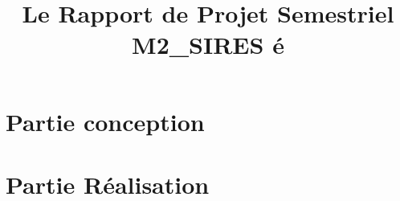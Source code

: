 \documentclass[a4paper,12pt]{article}
\begin{document}
\title{Le Rapport de Projet Semestriel M2_SIRES \'{e}}
         





\tableofcontents
\newpage
\listoffigures
\newpage
\listoftables
\newpage


\part*{Partie conception}





\part*{Partie R\'{e}alisation}





%
\end{document}

